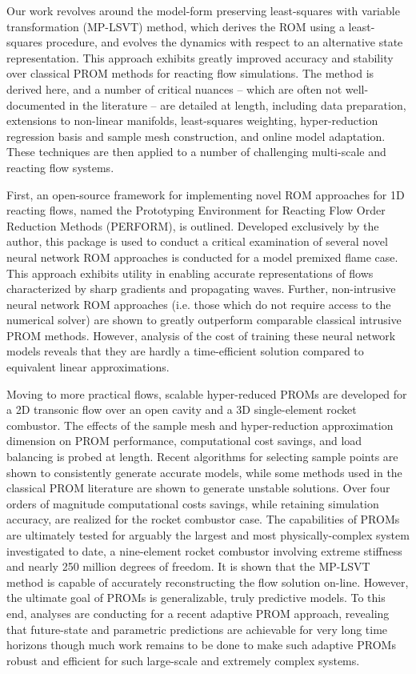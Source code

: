 Our work revolves around the model-form preserving least-squares with variable transformation (MP-LSVT) method, which derives the ROM using a least-squares procedure, and evolves the dynamics with respect to an alternative state representation. This approach exhibits greatly improved accuracy and stability over classical PROM methods for reacting flow simulations. The method is derived here, and a number of critical nuances -- which are often not well-documented in the literature -- are detailed at length, including data preparation, extensions to non-linear manifolds, least-squares weighting, hyper-reduction regression basis and sample mesh construction, and online model adaptation. These techniques are then applied to a number of challenging multi-scale and reacting flow systems.

First, an open-source framework for implementing novel ROM approaches for 1D reacting flows, named the Prototyping Environment for Reacting Flow Order Reduction Methods (PERFORM), is outlined. Developed exclusively by the author, this package is used to conduct a critical examination of several novel neural network ROM approaches is conducted for a model premixed flame case. This approach exhibits utility in enabling accurate representations of flows characterized by sharp gradients and propagating waves. Further, non-intrusive neural network ROM approaches (i.e. those which do not require access to the numerical solver) are shown to greatly outperform comparable classical intrusive PROM methods. However, analysis of the cost of training these neural network models reveals that they are hardly a time-efficient solution compared to equivalent linear approximations.

Moving to more practical flows, scalable hyper-reduced PROMs are developed for a 2D transonic flow over an open cavity and a 3D single-element rocket combustor. The effects of the sample mesh and hyper-reduction approximation dimension on PROM performance, computational cost savings, and load balancing is probed at length. Recent algorithms for selecting sample points are shown to consistently generate accurate models, while some methods used in the classical PROM literature are shown to generate unstable solutions. Over four orders of magnitude computational costs savings, while retaining simulation accuracy, are realized for the rocket combustor case. The capabilities of PROMs are ultimately tested for arguably the largest and most physically-complex system investigated to date, a nine-element rocket combustor involving extreme stiffness and nearly 250 million degrees of freedom. It is shown that the MP-LSVT method is capable of accurately reconstructing the flow solution on-line. However, the ultimate goal of PROMs is generalizable, truly predictive models. To this end, analyses are conducting for a recent adaptive PROM approach, revealing that future-state and parametric predictions are achievable for very long time horizons though much work remains to be done to make such adaptive PROMs robust and efficient for such large-scale and extremely complex systems.

